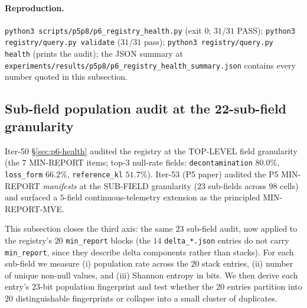 \paragraph{Reproduction.}
\texttt{python3 scripts/p5p8/p6\_registry\_health.py} (exit $0$;
$31/31$ PASS); \texttt{python3 registry/query.py validate} ($31/31$
pass); \texttt{python3 registry/query.py health} (prints the audit);
the JSON summary at
\texttt{experiments/results/p5p8/p6\_registry\_health\_summary.json}
contains every number quoted in this subsection.

\subsection{Sub-field population audit at the 22-sub-field granularity}
\label{sec:p6-minreport-subfield}

Iter-50 \S\ref{sec:p6-health} audited the registry at the TOP-LEVEL
field granularity (the $7$ MIN-REPORT items; top-3 null-rate fields:
\texttt{decontamination} $80.0\%$, \texttt{loss\_form} $66.2\%$,
\texttt{reference\_kl} $51.7\%$). Iter-53 (P5 paper) audited the P5 MIN-REPORT \emph{manifests} at the
SUB-FIELD granularity ($23$ sub-fields across $98$ cells) and surfaced
a $5$-field continuous-telemetry extension as the principled MIN-REPORT-MVE.

This subsection closes the third axis: the same $23$ sub-field audit,
now applied to the registry's $20$ \texttt{min\_report} blocks (the $14$
\texttt{delta\_*.json} entries do not carry \texttt{min\_report}, since
they describe delta components rather than stacks). For each sub-field
we measure (i) population rate across the $20$ stack entries,
(ii) number of unique non-null values, and (iii) Shannon entropy in
bits. We then derive each entry's $23$-bit population fingerprint and
test whether the $20$ entries partition into $20$ distinguishable
fingerprints or collapse into a small cluster of duplicates.


